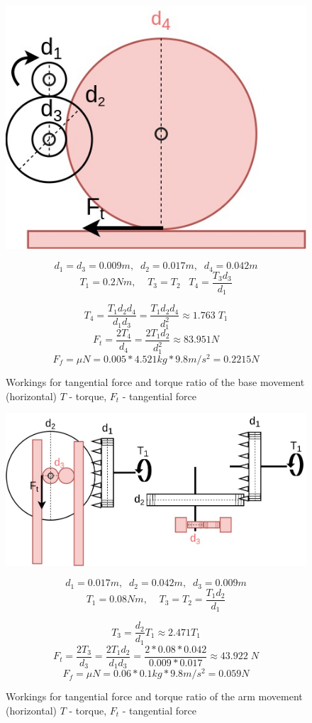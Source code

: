 \documentclass{article}
\begin{document}
\begin{figure}
\centerline{\includegraphics[width=0.7\columnwidth]{figs-demo2/BASEGEARS.jpg}}

\[ d_1=d_3=0.009 m, \;\; d_2=0.017 m, \;\; d_4=0.042 m  \]
\[ T_1 = 0.2 Nm, \;\;\;\;  T_3=T_2 \;\;\; T_4 = \frac{T_3 d_3}{d_1} \]

\[  T_4 = \frac{T_1 d_2 d_4}{d_1 d_3} = \frac{T_1 d_2 d_4}{d_1^2} \approx 1.763 \; T_1\]
\[ F_t = \frac{2 T_4}{d_4} = \frac{2 T_1 d_2}{d_1^2} \approx 83.951 N \]
\[ F_f = \mu N = 0.005 * 4.521 kg * 9.8 m/s^2 = 0.2215 N \]

\caption{Workings for tangential force and torque ratio of the base movement (horizontal) \(T\) - torque, \(F_t\) - tangential force}
\label{fig:base-formula}
\end{figure}


\begin{figure}
\includegraphics[width=1\columnwidth]{figs-demo2/ARMGEARS.jpg}

\[ d_1=0.017 m, \;\; d_2=0.042 m, \;\; d_3=0.009 m  \]
\[ T_1 = 0.08 Nm, \;\;\;\; T_3=T_2=\frac{T_1 d_2}{d_1} \]


\[  T_3 = \frac{d_2}{d_1}T_1 \approx 2.471T_1\]
\[ F_t = \frac{2 T_3}{d_3} = \frac{2 T_1 d_2}{d_1 d_3} = \frac{2*0.08*0.042}{0.009*0.017} \approx 43.922 \; N \]
\[ F_f = \mu N = 0.06 * 0.1 kg * 9.8 m/s^2 = 0.059 N \]


\caption{Workings for tangential force and torque ratio of the arm movement (horizontal) \(T\) - torque, \(F_t\) - tangential force}
\label{fig:arm-formula}
\end{figure}
\end{document}
